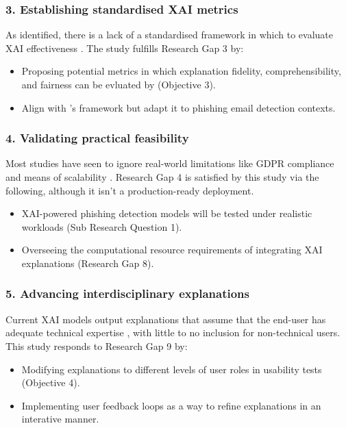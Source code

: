 \subsubsection*{3. Establishing standardised XAI metrics}
As identified, there is a lack of a standardised framework in which to evaluate XAI effectiveness \citep{reddy2023explainable}. The study fulfills Research Gap 3 by:

\begin{itemize}
  \item Proposing potential metrics in which explanation fidelity, comprehensibility, and fairness can be evluated by (Objective 3).
  \item Align with \cite{shendkar2024enhancing}'s framework but adapt it to phishing email detection contexts.
\end{itemize}

\subsubsection*{4. Validating practical feasibility}
Most studies have seen to ignore real-world limitations like GDPR compliance and means of scalability \citep{kapoor2024comparative}. Research Gap 4 is satisfied by this study via the following, although it isn't a production-ready deployment.

\begin{itemize}
  \item XAI-powered phishing detection models will be tested under realistic workloads (Sub Research Question 1).
  \item Overseeing the computational resource requirements of integrating XAI explanations (Research Gap 8).
\end{itemize}

\subsubsection*{5. Advancing interdisciplinary explanations}
Current XAI models output explanations that assume that the end-user has adequate technical expertise \citep{greco2023explaining}, with little to no inclusion for non-technical users. This study responds to Research Gap 9 by:

\begin{itemize}
  \item Modifying explanations to different levels of user roles in usability tests (Objective 4).
  \item Implementing user feedback loops as a way to refine explanations in an interative manner.
\end{itemize}

